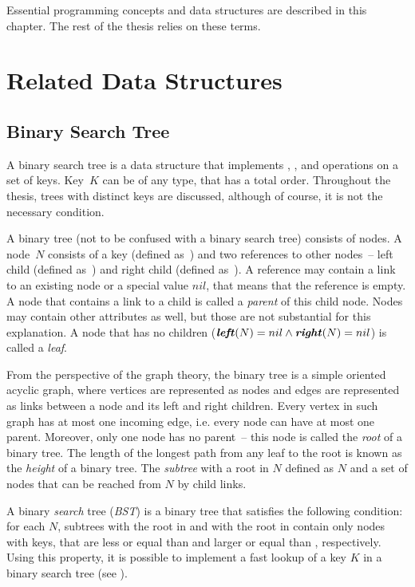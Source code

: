 Essential programming concepts and data structures are described in this chapter. The rest of the thesis relies on these terms.

\section{Related Data Structures}

\subsection{Binary Search Tree}

A binary search tree is a data structure that implements \findop, \insertop, and \removeop operations on a set of keys. Key~$K$ can be of any type, that has a total order. Throughout the thesis, trees with distinct keys are discussed, although of course, it is not the necessary condition.

A binary tree (not to be confused with a binary search tree) consists of nodes. A node~$N$ consists of a key (defined as~) and two references to other nodes~-- left child (defined as~) and right child (defined as~). A reference may contain a link to an existing node or a special value $nil$, that means that the reference is empty. A node that contains a link to a child is called a \emph{parent} of this child node. Nodes may contain other attributes as well, but those are not substantial for this explanation. A node that has no children (\(\textbf{\textit{left}}(N) = nil \land \textbf{\textit{right}}(N) = nil\)) is called a \emph{leaf}.

From the perspective of the graph theory, the binary tree is a simple oriented acyclic graph, where vertices are represented as nodes and edges are represented as links between a node and its left and right children. Every vertex in such graph has at most one incoming edge, i.e. every node can have at most one parent. Moreover, only one node has no parent~-- this node is called the \emph{root} of a binary tree. The length of the longest path from any leaf to the root is known as the \emph{height} of a binary tree. The \emph{subtree} with a root in $N$ defined as $N$ and a set of nodes that can be reached from $N$ by child links.

A binary \emph{search} tree (\emph{BST}) is a binary tree that satisfies the following condition: for each $N$, subtrees with the root in  and with the root in  contain only nodes with keys, that are less or equal than  and larger or equal than , respectively. Using this property, it is possible to implement a fast lookup of a key $K$ in a binary search tree (see ).

